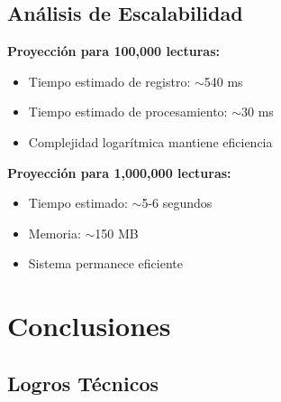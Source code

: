 \documentclass[12pt,a4paper]{article}
\begin{document}
\subsection{Análisis de Escalabilidad}

\textbf{Proyección para 100,000 lecturas:}
\begin{itemize}
    \item Tiempo estimado de registro: $\sim$540 ms
    \item Tiempo estimado de procesamiento: $\sim$30 ms
    \item Complejidad logarítmica mantiene eficiencia
\end{itemize}

\textbf{Proyección para 1,000,000 lecturas:}
\begin{itemize}
    \item Tiempo estimado: $\sim$5-6 segundos
    \item Memoria: $\sim$150 MB
    \item Sistema permanece eficiente
\end{itemize}


\section{Conclusiones}

\subsection{Logros Técnicos}
\end{document}
